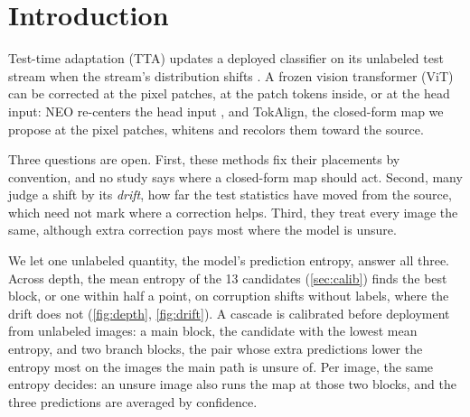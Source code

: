 \documentclass{article}
\newcommand{\tok}{TokAlign}
\newcommand{\neo}{NEO}
\begin{document}
\section{Introduction}
\label{sec:intro}
Test-time adaptation (TTA) updates a deployed classifier on its unlabeled test stream when the stream's distribution shifts \citep{tent2021}. A frozen vision transformer (ViT) can be corrected at the pixel patches, at the patch tokens inside, or at the head input: \neo{} re-centers the head input \citep{neo2026}, and \tok{}, the closed-form map we propose at the pixel patches, whitens and recolors them toward the source.

Three questions are open. First, these methods fix their placements by convention, and no study says where a closed-form map should act. Second, many judge a shift by its \emph{drift}, how far the test statistics have moved from the source, which need not mark where a correction helps. Third, they treat every image the same, although extra correction pays most where the model is unsure.

We let one unlabeled quantity, the model's prediction entropy, answer all three. Across depth, the mean entropy of the 13 candidates (\cref{sec:calib}) finds the best block, or one within half a point, on corruption shifts without labels, where the drift does not (\cref{fig:depth}, \cref{fig:drift}). A cascade is calibrated before deployment from unlabeled images: a main block, the candidate with the lowest mean entropy, and two branch blocks, the pair whose extra predictions lower the entropy most on the images the main path is unsure of. Per image, the same entropy decides: an unsure image also runs the map at those two blocks, and the three predictions are averaged by confidence.
\end{document}
